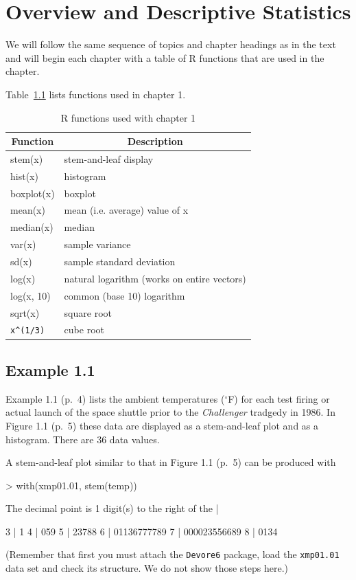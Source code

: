 \documentclass{book}
\begin{document}
\chapter{Overview and Descriptive Statistics}
\label{ch:overview}

We will follow the same sequence of topics and chapter headings as in
the text and will begin each chapter with a table of R functions that
are used in the chapter.

Table~\ref{tab:ch1} lists functions used in chapter 1.
\begin{table}[htbp]
  \centering
  \begin{tabular}{l l}
    \multicolumn{1}{c}{\textbf{Function}} &
    \multicolumn{1}{c}{\textbf{Description}} \\\hline
    stem(x)   & stem-and-leaf display\\
    hist(x)   & histogram\\
    boxplot(x)& boxplot\\
    mean(x)   & mean (i.e. average) value of x\\
    median(x) & median\\
    var(x)    & sample variance\\
    sd(x)     & sample standard deviation\\
    log(x)    & natural logarithm (works on entire vectors)\\
    log(x, 10)& common (base 10) logarithm\\
    sqrt(x)   & square root\\
    \verb+x^(1/3)+  & cube root\\
    \hline
  \end{tabular}
  \caption{R functions used with chapter 1}
  \label{tab:ch1}
\end{table}

\section{Example 1.1}
\label{sec:xmp01.01}

Example 1.1 (p.~4) lists the ambient temperatures ($^\circ$F) for each
test firing or actual launch of the space shuttle prior to the
\emph{Challenger} tradgedy in 1986.  In Figure 1.1 (p.~5) these data
are displayed as a stem-and-leaf plot and as a histogram.  There are
36 data values.

A stem-and-leaf plot similar to that in Figure 1.1 (p.~5) can be produced with
\begin{Schunk}
\begin{Sinput}
> with(xmp01.01, stem(temp))
\end{Sinput}
\begin{Soutput}
  The decimal point is 1 digit(s) to the right of the |

  3 | 1
  4 | 059
  5 | 23788
  6 | 01136777789
  7 | 000023556689
  8 | 0134
\end{Soutput}
\end{Schunk}
(Remember that first you must attach the \texttt{Devore6} package,
load the \texttt{xmp01.01} data set and check its structure.  We do
not show those steps here.)
\end{document}

